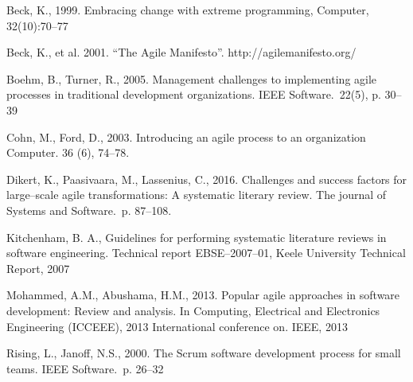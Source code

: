 \renewcommand{\baselinestretch}{1.0}
\setlength{\parskip}{0.5em}

Beck, K., 1999. Embracing change with extreme programming, Computer,
32(10):70–77

Beck, K., et al. 2001. ``The Agile Manifesto''.
http://agilemanifesto.org/

Boehm, B., Turner, R., 2005. Management challenges to implementing agile
processes in traditional development organizations. IEEE Software.\ 22(5), p. 30–39

Cohn, M., Ford, D., 2003. Introducing an agile process to an
organization Computer. 36 (6), 74–78.

Dikert, K., Paasivaara, M., Lassenius, C., 2016. Challenges and success factors
for large–scale agile transformations: A systematic literary review. The journal
of Systems and Software.\ p. 87–108.

Kitchenham, B. A., Guidelines for performing systematic literature
reviews in software engineering. Technical report EBSE–2007–01, Keele University
Technical Report, 2007

Mohammed, A.M., Abushama, H.M., 2013. Popular agile approaches in software
development: Review and analysis. In Computing, Electrical and Electronics
Engineering (ICCEEE), 2013 International conference on. IEEE, 2013

Rising, L., Janoff, N.S., 2000. The Scrum software development process for small teams. IEEE Software.\ p. 26–32
